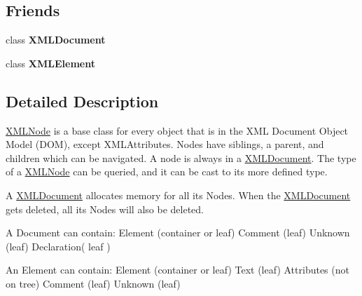 \subsection*{Friends}
\begin{DoxyCompactItemize}
\item 
\hypertarget{classtinyxml2_1_1_x_m_l_node_a4eee3bda60c60a30e4e8cd4ea91c4c6e}{class {\bfseries X\-M\-L\-Document}}\label{classtinyxml2_1_1_x_m_l_node_a4eee3bda60c60a30e4e8cd4ea91c4c6e}

\item 
\hypertarget{classtinyxml2_1_1_x_m_l_node_ac2fba9b6e452829dd892f7392c24e0eb}{class {\bfseries X\-M\-L\-Element}}\label{classtinyxml2_1_1_x_m_l_node_ac2fba9b6e452829dd892f7392c24e0eb}

\end{DoxyCompactItemize}


\subsection{Detailed Description}
\hyperlink{classtinyxml2_1_1_x_m_l_node}{X\-M\-L\-Node} is a base class for every object that is in the X\-M\-L Document Object Model (D\-O\-M), except X\-M\-L\-Attributes. Nodes have siblings, a parent, and children which can be navigated. A node is always in a \hyperlink{classtinyxml2_1_1_x_m_l_document}{X\-M\-L\-Document}. The type of a \hyperlink{classtinyxml2_1_1_x_m_l_node}{X\-M\-L\-Node} can be queried, and it can be cast to its more defined type.

A \hyperlink{classtinyxml2_1_1_x_m_l_document}{X\-M\-L\-Document} allocates memory for all its Nodes. When the \hyperlink{classtinyxml2_1_1_x_m_l_document}{X\-M\-L\-Document} gets deleted, all its Nodes will also be deleted.

\begin{DoxyVerb}A Document can contain: Element (container or leaf)
                        Comment (leaf)
                        Unknown (leaf)
                        Declaration( leaf )

An Element can contain: Element (container or leaf)
                        Text    (leaf)
                        Attributes (not on tree)
                        Comment (leaf)
                        Unknown (leaf)\end{DoxyVerb}
 

